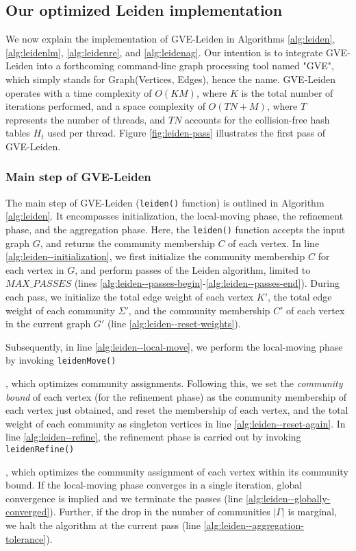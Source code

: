 \subsection{Our optimized Leiden implementation}

We now explain the implementation of GVE-Leiden in Algorithms \ref{alg:leiden}, \ref{alg:leidenlm}, \ref{alg:leidenre}, and \ref{alg:leidenag}. Our intention is to integrate GVE-Leiden into a forthcoming command-line graph processing tool named "GVE", which simply stands for Graph(Vertices, Edges), hence the name. GVE-Leiden operates with a time complexity of $O(KM)$, where $K$ is the total number of iterations performed, and a space complexity of $O(TN + M)$, where $T$ represents the number of threads, and $TN$ accounts for the collision-free hash tables $H_t$ used per thread. Figure \ref{fig:leiden-pass} illustrates the first pass of GVE-Leiden.


\subsubsection{Main step of GVE-Leiden}

The main step of GVE-Leiden (\texttt{leiden()} function) is outlined in Algorithm \ref{alg:leiden}. It encompasses initialization, the local-moving phase, the refinement phase, and the aggregation phase. Here, the \texttt{leiden()} function accepts the input graph $G$, and returns the community membership $C$ of each vertex. In line \ref{alg:leiden--initialization}, we first initialize the community membership $C$ for each vertex in $G$, and perform passes of the Leiden algorithm, limited to $MAX\_PASSES$ (lines \ref{alg:leiden--passes-begin}-\ref{alg:leiden--passes-end}). During each pass, we initialize the total edge weight of each vertex $K'$, the total edge weight of each community $\Sigma'$, and the community membership $C'$ of each vertex in the current graph $G'$ (line \ref{alg:leiden--reset-weights}).

Subsequently, in line \ref{alg:leiden--local-move}, we perform the local-moving phase by invoking \texttt{leidenMove()}, which optimizes community assignments. Following this, we set the \textit{community bound} of each vertex (for the refinement phase) as the community membership of each vertex just obtained, and reset the membership of each vertex, and the total weight of each community as singleton vertices in line \ref{alg:leiden--reset-again}. In line \ref{alg:leiden--refine}, the refinement phase is carried out by invoking \texttt{leidenRefine()}, which optimizes the community assignment of each vertex within its community bound. If the local-moving phase converges in a single iteration, global convergence is implied and we terminate the passes (line \ref{alg:leiden--globally-converged}). Further, if the drop in the number of communities $|\Gamma|$ is marginal, we halt the algorithm at the current pass (line \ref{alg:leiden--aggregation-tolerance}).

